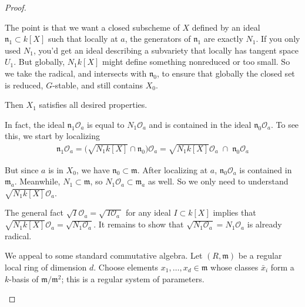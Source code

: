 \documentclass[12pt]{article}
\begin{document}
\begin{proof}
\begin{remark}
The point is that we want a closed subscheme of $X$ defined by an ideal $\mathfrak{n}_1 \subset k[X]$ such that locally at $a$, the generators of $\mathfrak{n}_1$ are exactly $N_1$. If you only used $N_1$, you’d get an ideal describing a subvariety that locally has tangent space $U_1$. But globally, $N_1 k[X]$ might define something nonreduced or too small. So we take the radical, and intersects with $\mathfrak{n}_0$, to ensure that globally the closed set is reduced, $G$-stable, and still contains $X_0$.
\end{remark}




Then $X_1$ satisfies all desired properties.  

In fact, the ideal $\mathfrak{n}_1 \mathcal{O}_a$ is equal to $N_1 \mathcal{O}_a$ and is contained in the ideal $\mathfrak{n}_0 \mathcal{O}_a$. To see this, we start by localizing \begin{align*}
    \mathfrak n_1 \mathcal O_a
= \big(\sqrt{N_1 k[X]} \cap \mathfrak n_0\big)\mathcal O_a
= \sqrt{N_1 k[X]}\mathcal O_a \;\cap\; \mathfrak n_0 \mathcal O_a
\end{align*}

But since $a$ is in $X_0$, we have $\mathfrak{n}_0 \subset \mathfrak{m}$. After localizing at $a$, $\mathfrak{n}_0\mathcal{O}_a$ is contained in $\mathfrak{m}_a$. Meanwhile, $N_1\subset \mathfrak{m}$, so $N_1\mathcal{O}_a \subset \mathfrak{m}_a$ as well. So we only need to understand $\sqrt{N_1 k[X]}\mathcal{O}_a$.

The general fact $\sqrt{I}\mathcal{O}_a = \sqrt{\,I\mathcal{O}_a\,}$ for any ideal $I \subset k[X]$ implies that $\sqrt{N_1k[X]} \mathcal{O}_a = \sqrt{N_1 \mathcal{O}_a}$. It remains to show that $\sqrt{N_1\mathcal{O}_a} = N_1\mathcal{O}_a$ is already radical.

\begin{remark}
    We appeal to some standard commutative algebra. Let $(R,\mathfrak{m})$ be a regular local ring of dimension $d$.
    Choose elements $x_1,\dots,x_d\in\mathfrak{m}$ whose classes $\bar{x}_i$ form a $k$-basis of $\mathfrak{m}/\mathfrak{m}^2$; this is a regular system of parameters.


\end{remark}
\end{proof}
\end{document}
